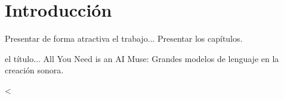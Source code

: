 \chapter{Introducción}

Presentar de forma atractiva el trabajo... 
Presentar los capítulos.


el título... All You Need is an AI Muse: Grandes modelos de lenguaje en la creación sonora.

<





